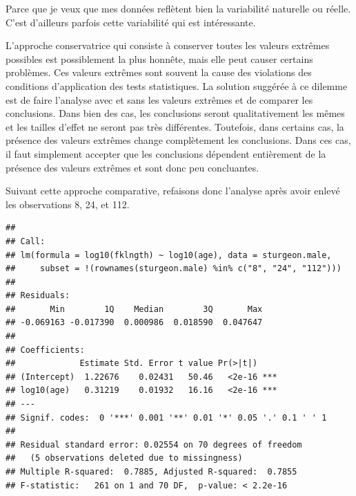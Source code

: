 \documentclass[12pt,]{book}
\newenvironment{Shaded}{\begin{snugshade}}{\end{snugshade}}
\newcommand{\DataTypeTok}[1]{\textcolor[rgb]{0.27,0.27,0.27}{#1}}
\newcommand{\FloatTok}[1]{\textcolor[rgb]{0.06,0.06,0.06}{#1}}
\newcommand{\KeywordTok}[1]{\textcolor[rgb]{0.27,0.27,0.27}{\textbf{#1}}}
\newcommand{\NormalTok}[1]{#1}
\newcommand{\OperatorTok}[1]{\textcolor[rgb]{0.43,0.43,0.43}{\textbf{#1}}}
\newcommand{\StringTok}[1]{\textcolor[rgb]{0.5,0.5,0.5}{#1}}
\begin{document}
Parce que je veux que mes données reflètent bien la variabilité naturelle ou réelle. C'est d'ailleurs parfois cette variabilité qui est intéressante.

L'approche conservatrice qui consiste à conserver toutes les valeurs extrêmes possibles est possiblement la plus honnête, mais elle peut causer certains problèmes. Ces valeurs extrêmes sont souvent la cause des violations des conditions d'application des tests statistiques. La solution suggérée à ce dilemme est de faire l'analyse avec et sans les valeurs extrêmes et de comparer les conclusions. Dans bien des cas, les conclusions seront qualitativement les mêmes et les tailles d'effet ne seront pas très différentes. Toutefois, dans certains cas, la présence des valeurs extrêmes change complètement les conclusions. Dans ces cas, il faut simplement accepter que les conclusions dépendent entièrement de la présence des valeurs extrêmes et sont donc peu concluantes.

Suivant cette approche comparative, refaisons donc l'analyse après
avoir enlevé les observations 8, 24, et 112.

\begin{Shaded}
\end{Shaded}

\begin{verbatim}
## 
## Call:
## lm(formula = log10(fklngth) ~ log10(age), data = sturgeon.male, 
##     subset = !(rownames(sturgeon.male) %in% c("8", "24", "112")))
## 
## Residuals:
##       Min        1Q    Median        3Q       Max 
## -0.069163 -0.017390  0.000986  0.018590  0.047647 
## 
## Coefficients:
##             Estimate Std. Error t value Pr(>|t|)    
## (Intercept)  1.22676    0.02431   50.46   <2e-16 ***
## log10(age)   0.31219    0.01932   16.16   <2e-16 ***
## ---
## Signif. codes:  0 '***' 0.001 '**' 0.01 '*' 0.05 '.' 0.1 ' ' 1
## 
## Residual standard error: 0.02554 on 70 degrees of freedom
##   (5 observations deleted due to missingness)
## Multiple R-squared:  0.7885,	Adjusted R-squared:  0.7855 
## F-statistic:   261 on 1 and 70 DF,  p-value: < 2.2e-16
\end{verbatim}
\end{document}
